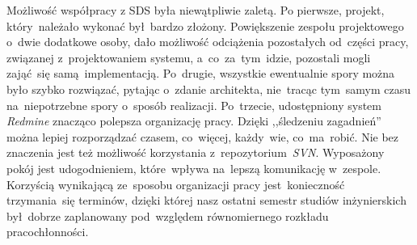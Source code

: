 Możliwość współpracy z SDS była niewątpliwie zaletą. Po pierwsze, projekt, który~należało wykonać był~bardzo złożony. Powiększenie zespołu projektowego o~dwie dodatkowe osoby, dało możliwość odciążenia pozostałych od~części pracy, związanej z~projektowaniem systemu, a~co~za~tym~idzie, pozostali mogli zająć~się samą~implementacją. Po~drugie, wszystkie ewentualnie spory można było szybko rozwiązać, pytając o~zdanie architekta, nie~tracąc tym~samym czasu na~niepotrzebne spory o~sposób realizacji. Po~trzecie, udostępniony system \textit{Redmine} znacząco polepsza organizację pracy. Dzięki ,,śledzeniu zagadnień'' można lepiej rozporządzać czasem, co~więcej, każdy~wie, co~ma~robić. Nie bez znaczenia jest też możliwość korzystania z~repozytorium~\textit{SVN}. Wyposażony pokój jest udogodnieniem, które~wpływa na~lepszą komunikację w~zespole. Korzyścią wynikającą ze~sposobu organizacji pracy jest~konieczność trzymania~się terminów, dzięki której nasz ostatni semestr studiów inżynierskich był~dobrze zaplanowany pod~względem równomiernego rozkładu pracochłonności.